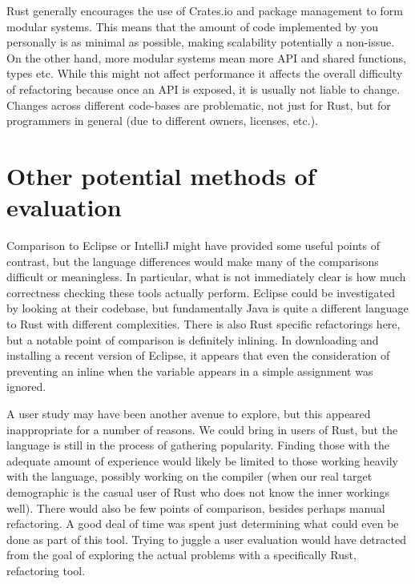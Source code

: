 Rust generally encourages the use of Crates.io and package management to form modular systems. This means that the amount of code implemented by you personally is as minimal as possible, making scalability potentially a non-issue. On the other hand, more modular systems mean more API and shared functions, types etc. While this might not affect performance it affects the overall difficulty of refactoring because once an API is exposed, it is usually not liable to change. Changes across different code-bases are problematic, not just for Rust, but for programmers in general (due to different owners, licenses, etc.).





\section{Other potential methods of evaluation} \label{S:otherstuff}
Comparison to Eclipse or IntelliJ might have provided some useful points of contrast, but the language differences would make many of the comparisons difficult or meaningless. In particular, what is not immediately clear is how much correctness checking these tools actually perform. Eclipse could be investigated by looking at their codebase, but fundamentally Java is quite a different language to Rust with different complexities. There is also Rust specific refactorings here, but a notable point of comparison is definitely inlining. In downloading and installing a recent version of Eclipse, it appears that even the consideration of preventing an inline when the variable appears in a simple assignment was ignored.

A user study may have been another avenue to explore, but this appeared inappropriate for a number of reasons. We could bring in users of Rust, but the language is still in the process of gathering popularity. Finding those with the adequate amount of experience would likely be limited to those working heavily with the language, possibly working on the compiler (when our real target demographic is the casual user of Rust who does not know the inner workings well). There would also be few points of comparison, besides perhaps manual refactoring. A good deal of time was spent just determining what could even be done as part of this tool. Trying to juggle a user evaluation would have detracted from the goal of exploring the actual problems with a specifically Rust, refactoring tool. 
